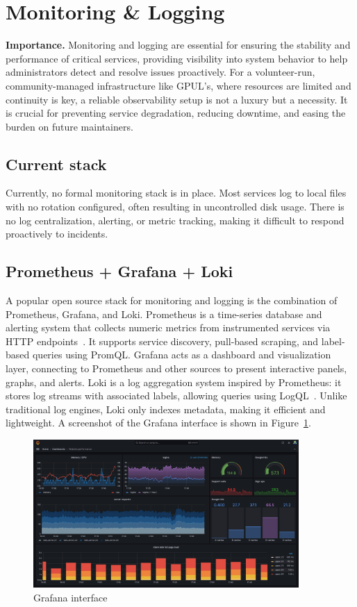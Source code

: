 \section{Monitoring \& Logging}

\textbf{Importance.} Monitoring and logging are essential for ensuring the stability and performance of critical services, providing visibility into system behavior to help administrators detect and resolve issues proactively. For a volunteer-run, community-managed infrastructure like GPUL's, where resources are limited and continuity is key, a reliable observability setup is not a luxury but a necessity. It is crucial for preventing service degradation, reducing downtime, and easing the burden on future maintainers.

\subsection*{Current stack}
Currently, no formal monitoring stack is in place. Most services log to local files with no rotation configured, often resulting in uncontrolled disk usage. There is no log centralization, alerting, or metric tracking, making it difficult to respond proactively to incidents.

\subsection*{Prometheus + Grafana + Loki}
A popular open source stack for monitoring and logging is the combination of Prometheus, Grafana, and Loki. Prometheus is a time-series database and alerting system that collects numeric metrics from instrumented services via HTTP endpoints~\cite{prometheus-docs}. It supports service discovery, pull-based scraping, and label-based queries using PromQL. Grafana acts as a dashboard and visualization layer, connecting to Prometheus and other sources to present interactive panels, graphs, and alerts. Loki is a log aggregation system inspired by Prometheus: it stores log streams with associated labels, allowing queries using LogQL~\cite{loki-docs}. Unlike traditional log engines, Loki only indexes metadata, making it efficient and lightweight. A screenshot of the Grafana interface is shown in Figure~\ref{fig:grafana-ui}.

\begin{figure}[H]
  \centering
  \includegraphics[width=0.9\textwidth]{imaxes/grafana-ui.png}
  \caption{Grafana interface}
  \label{fig:grafana-ui}
\end{figure}

